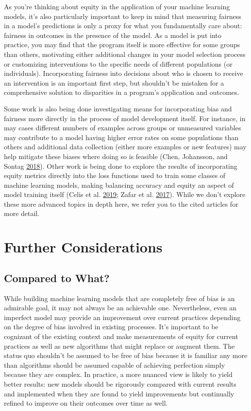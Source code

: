 \documentclass[]{krantz}
\begin{document}
As you're thinking about equity in the application of your machine
learning models, it's also particularly important to keep in mind that
measuring fairness in a model's predictions is only a proxy for what you
fundamentally care about: fairness in outcomes in the presence of the
model. As a model is put into practice, you may find that the program
itself is more effective for some groups than others, motivating either
additional changes in your model selection process or customizing
interventions to the specific needs of different populations (or
individuals). Incorporating fairness into decisions about who is chosen
to receive an intervention is an important first step, but shouldn't be
mistaken for a comprehensive solution to disparities in a program's
application and outcomes.

Some work is also being done investigating means for incorporating bias
and fairness more directly in the process of model development itself.
For instance, in may cases different numbers of examples across groups
or unmeasured variables may contribute to a model having higher error
rates on some populations than others and additional data collection
(either more examples or new features) may help mitigate these biases
where doing so is feasible (Chen, Johansson, and Sontag
\protect\hyperlink{ref-chen2018}{2018}). Other work is being done to
explore the results of incorporating equity metrics directly into the
loss functions used to train some classes of machine learning models,
making balancing accuracy and equity an aspect of model training itself
(Celis et al. \protect\hyperlink{ref-celis2019}{2019}; Zafar et al.
\protect\hyperlink{ref-zafar2017}{2017}). While we don't explore these
more advanced topics in depth here, we refer you to the cited articles
for more detail.

\section{Further Considerations}\label{further-considerations}

\subsection{Compared to What?}\label{compared-to-what}

While building machine learning models that are completely free of bias
is an admirable goal, it may not always be an achievable one.
Nevertheless, even an imperfect model may provide an improvement over
current practices depending on the degree of bias involved in existing
processes. It's important to be cognizant of the existing context and
make measurements of equity for current practices as well as new
algorithms that might replace or augment them. The status quo shouldn't
be assumed to be free of bias because it is familiar any more than
algorithms should be assumed capable of achieving perfection simply
because they are complex. In practice, a more nuanced view is likely to
yield better results: new models should be rigorously compared with
current results and implemented when they are found to yield
improvements but continually refined to improve on their outcomes over
time as well.
\end{document}
